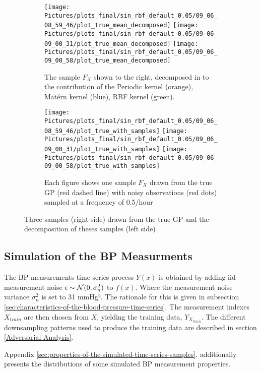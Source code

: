 \begin{figure}[!ht]
\centering
\begin{subfigure}{.45\textwidth}
    \centering
    \texttt{[image: Pictures/plots\_final/sin\_rbf\_default\_0.05/09\_06\_08\_59\_46/plot\_true\_mean\_decomposed]}
    \texttt{[image: Pictures/plots\_final/sin\_rbf\_default\_0.05/09\_06\_09\_00\_31/plot\_true\_mean\_decomposed]}
    \texttt{[image: Pictures/plots\_final/sin\_rbf\_default\_0.05/09\_06\_09\_00\_58/plot\_true\_mean\_decomposed]}
  \caption{The sample $F_X$ shown to the right, decomposed in to the contribution of the Periodic kernel (orange),
      Matérn kernel (blue), RBF kernel (green).}
  \label{fig:true_mean_decomposed}
\end{subfigure}\hfill
\begin{subfigure}{.45\textwidth}
    \centering
    \texttt{[image: Pictures/plots\_final/sin\_rbf\_default\_0.05/09\_06\_08\_59\_46/plot\_true\_with\_samples]}
    \texttt{[image: Pictures/plots\_final/sin\_rbf\_default\_0.05/09\_06\_09\_00\_31/plot\_true\_with\_samples]}
    \texttt{[image: Pictures/plots\_final/sin\_rbf\_default\_0.05/09\_06\_09\_00\_58/plot\_true\_with\_samples]}
  \caption{Each figure shows one sample $F_X$ drawn from the true GP (red dashed line) with noisy observations
      (red dots) sampled at a frequency of 0.5/hour}
  \label{fig:sub2}
\end{subfigure}
\caption{Three samples (right side) drawn from the true GP and the decomposition of theses samples (left side)}
\label{fig:true_gp_samples}
\end{figure}


\subsection{Simulation of the BP Measurments}

The BP measurements time series process $Y(x)$ is obtained by adding iid measurement noise
$\epsilon \sim \operatorname{\mathcal{N}}(0, \sigma_n^2)$ to $f(x)$.
Where the measurement noise variance $\sigma_n^2$ is set to 31 mmHg².
The rationale for this is given in subsection
\ref{sec:characteristics-of-the-blood-pressure-time-series}.
The measurement indexes $X_{train}$ are then chosen
from $X$, yielding the training data, $Y_{X_{train}}$.
The different downsampling patterns used to produce the training data
are described in section \ref{Adversarial Analysis}.

Appendix \ref{sec:properties-of-the-simulated-time-series-samples}.
additionally presents
the distributions of some simulated BP measurement properties.


